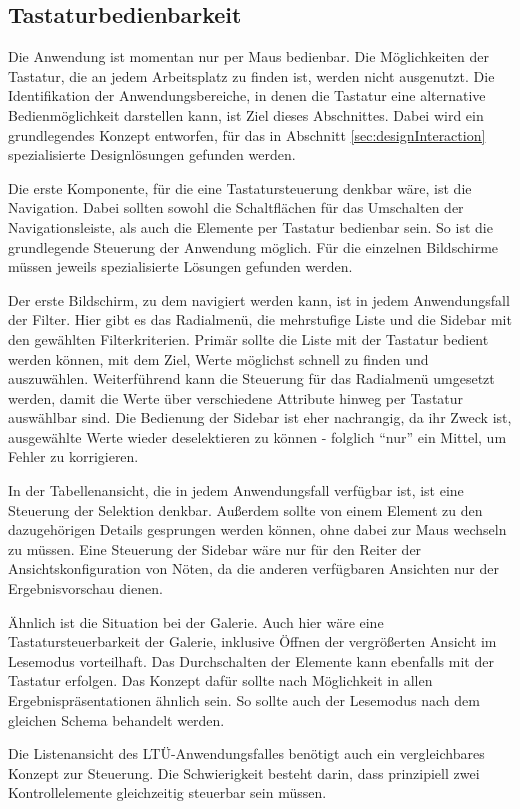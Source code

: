 \subsection{Tastaturbedienbarkeit}
Die Anwendung ist momentan nur per Maus bedienbar. Die Möglichkeiten der Tastatur, die an jedem Arbeitsplatz zu finden ist, werden nicht ausgenutzt. Die Identifikation der Anwendungsbereiche, in denen die Tastatur eine alternative Bedienmöglichkeit darstellen kann, ist Ziel dieses Abschnittes. Dabei wird ein grundlegendes Konzept entworfen, für das in Abschnitt \ref{sec:designInteraction} spezialisierte Designlösungen gefunden werden.\par
Die erste Komponente, für die eine Tastatursteuerung denkbar wäre, ist die Navigation. Dabei sollten sowohl die Schaltflächen für das Umschalten der Navigationsleiste, als auch die Elemente per Tastatur bedienbar sein. So ist die grundlegende Steuerung der Anwendung möglich. Für die einzelnen Bildschirme müssen jeweils spezialisierte Lösungen gefunden werden.\par
Der erste Bildschirm, zu dem navigiert werden kann, ist in jedem Anwendungsfall der Filter. Hier gibt es das Radialmenü, die mehrstufige Liste und die Sidebar mit den gewählten Filterkriterien. Primär sollte die Liste mit der Tastatur bedient werden können, mit dem Ziel, Werte möglichst schnell zu finden und auszuwählen. Weiterführend kann die Steuerung für das Radialmenü umgesetzt werden, damit die Werte über verschiedene Attribute hinweg per Tastatur auswählbar sind. Die Bedienung der Sidebar ist eher nachrangig, da ihr Zweck ist, ausgewählte Werte wieder deselektieren zu können - folglich \enquote{nur} ein Mittel, um Fehler zu korrigieren.\par
In der Tabellenansicht, die in jedem Anwendungsfall verfügbar ist, ist eine Steuerung der Selektion denkbar. Außerdem sollte von einem Element zu den dazugehörigen Details gesprungen werden können, ohne dabei zur Maus wechseln zu müssen. Eine Steuerung der Sidebar wäre nur für den Reiter der Ansichtskonfiguration von Nöten, da die anderen verfügbaren Ansichten nur der Ergebnisvorschau dienen.\par
Ähnlich ist die Situation bei der Galerie. Auch hier wäre eine Tastatursteuerbarkeit der Galerie, inklusive Öffnen der vergrößerten Ansicht im Lesemodus vorteilhaft. Das Durchschalten der Elemente kann ebenfalls mit der Tastatur erfolgen. Das Konzept dafür sollte nach Möglichkeit in allen Ergebnispräsentationen ähnlich sein. So sollte auch der Lesemodus nach dem gleichen Schema behandelt werden.\par
Die Listenansicht des LTÜ-Anwendungsfalles benötigt auch ein vergleichbares Konzept zur Steuerung. Die Schwierigkeit besteht darin, dass prinzipiell zwei Kontrollelemente gleichzeitig steuerbar sein müssen.\par
